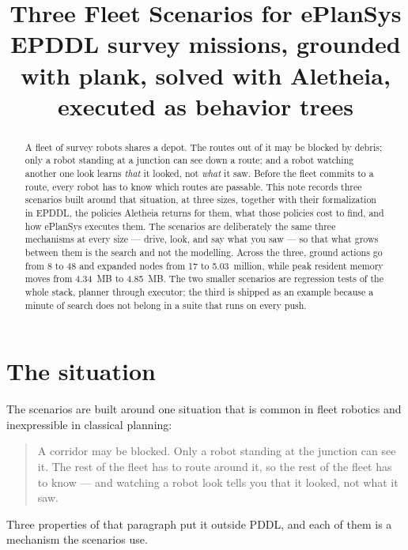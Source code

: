 \documentclass[11pt,a4paper]{article}
\title{\bfseries Three Fleet Scenarios for ePlanSys\\[2pt]
\large\normalfont\color{slate}EPDDL survey missions, grounded with \textsf{plank},
solved with Aletheia, executed as behavior trees}
\author{}
\date{}
\begin{document}
\maketitle
\thispagestyle{fancy}
\vspace{-2.2em}

\begin{abstract}
\noindent
A fleet of survey robots shares a depot. The routes out of it may be blocked by
debris; only a robot standing at a junction can see down a route; and a robot
watching another one look learns \emph{that} it looked, not \emph{what} it saw.
Before the fleet commits to a route, every robot has to know which routes are
passable. This note records three scenarios built around that situation, at
three sizes, together with their formalization in EPDDL, the policies Aletheia
returns for them, what those policies cost to find, and how ePlanSys executes
them. The scenarios are deliberately the same three mechanisms at every size
--- drive, look, and say what you saw --- so that what grows between them is the
search and not the modelling. Across the three, ground actions go from 8 to 48
and expanded nodes from 17 to 5.03~million, while peak resident memory moves
from 4.34~MB to 4.85~MB. The two smaller scenarios are regression tests of the
whole stack, planner through executor; the third is shipped as an example
because a minute of search does not belong in a suite that runs on every push.
\end{abstract}

\setcounter{tocdepth}{1}
{\small\tableofcontents}
\vspace{0.6em}

\section{The situation}

The scenarios are built around one situation that is common in fleet robotics
and inexpressible in classical planning:

\begin{quote}
A corridor may be blocked. Only a robot standing at the junction can see it.
The rest of the fleet has to route around it, so the rest of the fleet has to
know --- and watching a robot look tells you that it looked, not what it saw.
\end{quote}

Three properties of that paragraph put it outside PDDL, and each of them is a
mechanism the scenarios use.
\end{document}
